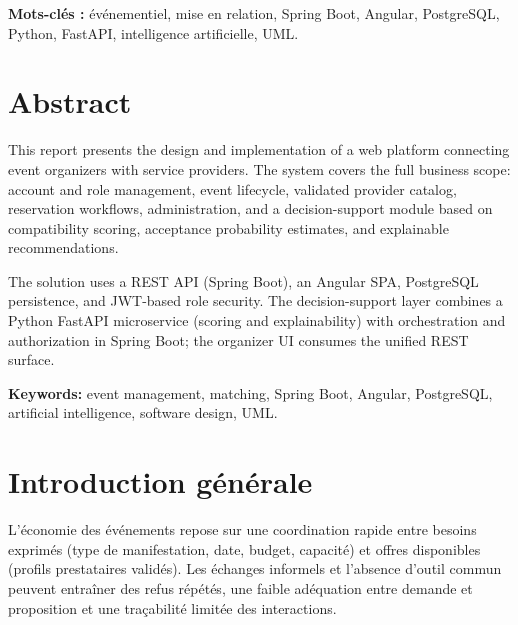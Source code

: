 \documentclass[a4paper,12pt]{report}
\begin{document}
\vspace{1em}

\noindent
\textbf{Mots-clés :} événementiel, mise en relation, Spring Boot, Angular, PostgreSQL, Python, FastAPI, intelligence artificielle, UML.

\chapter*{Abstract}

\noindent
This report presents the design and implementation of a web platform connecting event organizers with service providers. The system covers the full business scope: account and role management, event lifecycle, validated provider catalog, reservation workflows, administration, and a decision-support module based on compatibility scoring, acceptance probability estimates, and explainable recommendations.

\vspace{0.5em}

\noindent
The solution uses a REST API (Spring Boot), an Angular SPA, PostgreSQL persistence, and JWT-based role security. The decision-support layer combines a Python FastAPI microservice (scoring and explainability) with orchestration and authorization in Spring Boot; the organizer UI consumes the unified REST surface.

\vspace{1em}

\noindent
\textbf{Keywords:} event management, matching, Spring Boot, Angular, PostgreSQL, artificial intelligence, software design, UML.

\tableofcontents
\listoffigures
\newpage

\chapter*{Introduction générale}

\noindent
L'économie des événements repose sur une coordination rapide entre besoins exprimés (type de manifestation, date, budget, capacité) et offres disponibles (profils prestataires validés). Les échanges informels et l'absence d'outil commun peuvent entraîner des refus répétés, une faible adéquation entre demande et proposition et une traçabilité limitée des interactions.

\vspace{0.5em}
\end{document}
